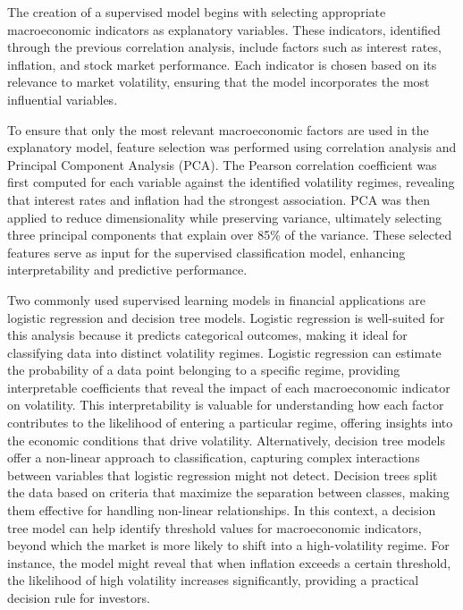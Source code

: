 The creation of a supervised model begins with selecting appropriate macroeconomic indicators as explanatory variables. These indicators, identified through the previous correlation analysis, include factors such as interest rates, inflation, and stock market performance. Each indicator is chosen based on its relevance to market volatility, ensuring that the model incorporates the most influential variables.

To ensure that only the most relevant macroeconomic factors are used in the explanatory model, feature selection was performed using correlation analysis and Principal Component Analysis (PCA). The Pearson correlation coefficient was first computed for each variable against the identified volatility regimes, revealing that interest rates and inflation had the strongest association. PCA was then applied to reduce dimensionality while preserving variance, ultimately selecting three principal components that explain over 85\% of the variance. These selected features serve as input for the supervised classification model, enhancing interpretability and predictive performance.

Two commonly used supervised learning models in financial applications are logistic regression and decision tree models. Logistic regression is well-suited for this analysis because it predicts categorical outcomes, making it ideal for classifying data into distinct volatility regimes. Logistic regression can estimate the probability of a data point belonging to a specific regime, providing interpretable coefficients that reveal the impact of each macroeconomic indicator on volatility. This interpretability is valuable for understanding how each factor contributes to the likelihood of entering a particular regime, offering insights into the economic conditions that drive volatility.
Alternatively, decision tree models offer a non-linear approach to classification, capturing complex interactions between variables that logistic regression might not detect. Decision trees split the data based on criteria that maximize the separation between classes, making them effective for handling non-linear relationships. In this context, a decision tree model can help identify threshold values for macroeconomic indicators, beyond which the market is more likely to shift into a high-volatility regime. For instance, the model might reveal that when inflation exceeds a certain threshold, the likelihood of high volatility increases significantly, providing a practical decision rule for investors.

